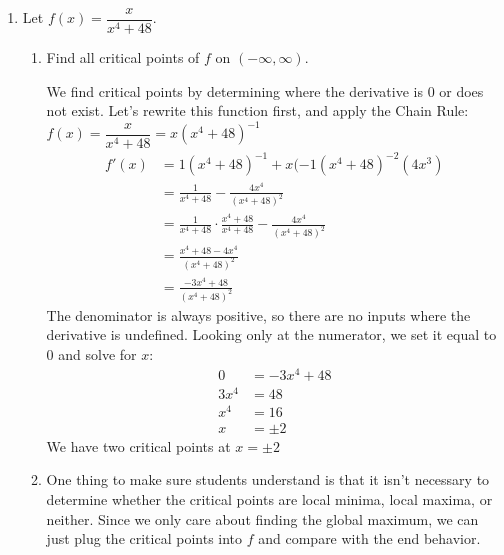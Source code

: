 \documentclass{article}
\begin{document}
\begin{enumerate}
\item  

  Let $f(x) = \dfrac{x}{x^4 + 48}$.
  \begin{enumerate}
  \item
    \begin{problem}[\vfill]
      Find all critical points of $f$ on $(-\infty, \infty)$.
    \end{problem}

\begin{solution}
    \begin{solution}
    We find critical points by determining where the derivative is 0 or does not exist. Let's rewrite this function first, and apply the Chain Rule:
    $f(x)=\dfrac{x}{x^4+48}=x(x^4+48)^{-1}$
    \begin{align*}
        f'(x)&=1(x^4+48)^{-1}+x(-1(x^4+48)^{-2}(4x^3)\\
        &=\frac{1}{x^4+48}-\frac{4x^4}{(x^4+48)^2}\\
        &=\frac{1}{x^4+48}\cdot \frac{x^4+48}{x^4+48}-\frac{4x^4}{(x^4+48)^2}\\
        &=\frac{x^4+48-4x^4}{(x^4+48)^2}\\
        &=\frac{-3x^4+48}{(x^4+48)^2}
    \end{align*}
    The denominator is always positive, so there are no inputs where the derivative is undefined. Looking only at the numerator, we set it equal to 0 and solve for $x$:
    \begin{align*}
        0&=-3x^4+48\\
       3x^4&=48\\
        x^4&=16\\
        x&= \pm 2
    \end{align*}
    We have two critical points at $x=\pm 2$
\end{solution}
\end{solution}
  \item

    \begin{workshop}
      One thing to make sure students understand is that it isn't necessary to determine whether the critical points are local minima, local maxima, or neither. Since we only care about finding the global maximum, we can just plug the critical points into $f$ and compare with the end behavior.
    \end{workshop}


\end{enumerate}
\end{enumerate}
\end{document}

